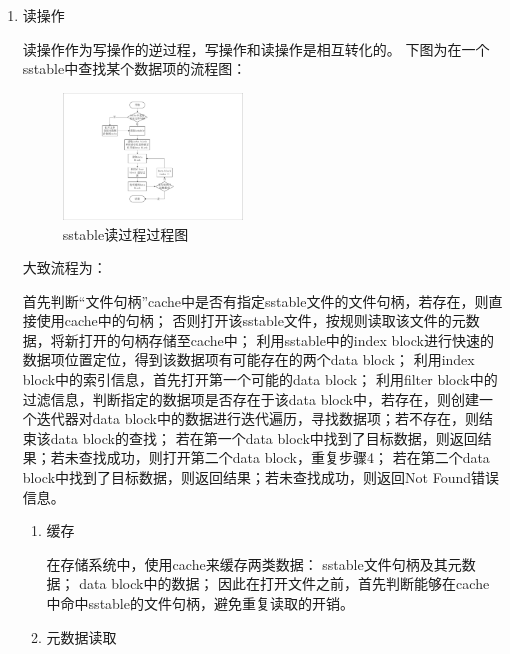 \begin{enumerate}
\begin{enumerate}
				\item 读操作
				
				读操作作为写操作的逆过程，写操作和读操作是相互转化的。
下图为在一个sstable中查找某个数据项的流程图：

\begin{figure}[H]
	\centering
	\includegraphics[width=0.45\textwidth]{pdf/sstable_read_procedure.pdf}
	\caption{sstable读过程过程图}
	\label{sstable_read_procedure}
\end{figure}

大致流程为：

首先判断“文件句柄”cache中是否有指定sstable文件的文件句柄，若存在，则直接使用cache中的句柄；
否则打开该sstable文件，按规则读取该文件的元数据，将新打开的句柄存储至cache中；
利用sstable中的index block进行快速的数据项位置定位，得到该数据项有可能存在的两个data block；
利用index block中的索引信息，首先打开第一个可能的data block；
利用filter block中的过滤信息，判断指定的数据项是否存在于该data block中，若存在，则创建一个迭代器对data block中的数据进行迭代遍历，寻找数据项；若不存在，则结束该data block的查找；
若在第一个data block中找到了目标数据，则返回结果；若未查找成功，则打开第二个data block，重复步骤4；
若在第二个data block中找到了目标数据，则返回结果；若未查找成功，则返回Not Found错误信息。

		\begin{enumerate}
			\item 缓存 
			

			在存储系统中，使用cache来缓存两类数据：
sstable文件句柄及其元数据；
data block中的数据；
因此在打开文件之前，首先判断能够在cache中命中sstable的文件句柄，避免重复读取的开销。

			\item 元数据读取 
			


\end{enumerate}
\end{enumerate}
\end{enumerate}
